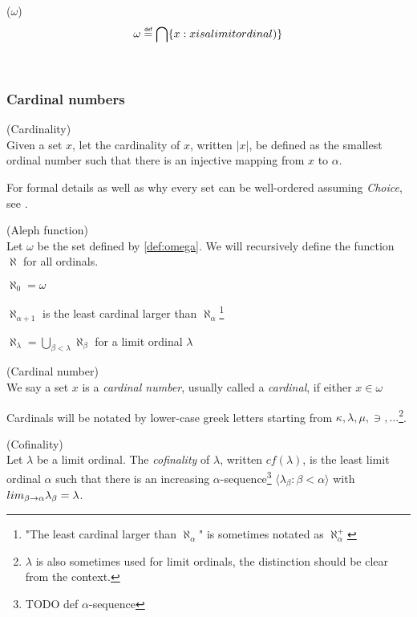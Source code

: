 \begin{definition}{($\omega$)}\\
\begin{equation}
\omega \defeq \bigcap\{x : x is a limit ordinal)\}
\end{equation}
\end{definition}

\

\subsubsection{Cardinal numbers}

\begin{definition}{(Cardinality)}\\
Given a set $x$, let the cardinality of $x$, written $|x|$, be defined as the smallest ordinal number such that there is an injective mapping from $x$ to $\alpha$.
\end{definition}
For formal details as well as why every set can be well-ordered assuming \emph{Choice}, see \cite{JechBook}.

\begin{definition}{(Aleph function)}\label{def:aleph}\\
Let $\omega$ be the set defined by \ref{def:omega}.
We will recursively define the function $\aleph$ for all ordinals.
\bce[(i)]
\item $\aleph_0 = \omega$
\item $\aleph_{\alpha+1}$ is the least cardinal larger than $\aleph_\alpha$\footnote{"The least cardinal larger than $\aleph_\alpha$" is sometimes notated as $\aleph_\alpha^{+}$}
\item $\aleph_\lambda = \bigcup_{\beta < \lambda}\aleph_\beta$ for a limit ordinal $\lambda$
\ece
\end{definition}

\begin{definition}{(Cardinal number)}\label{def:cardinal}\\
We say a set $x$ is a \emph{cardinal number}, usually called a \emph{cardinal}, if either $x \in \omega$
\end{definition}
Cardinals will be notated by lower-case greek letters starting from $\kappa, \lambda, \mu, \ni, \ldots$\footnote{$\lambda$ is also sometimes used for limit ordinals, the distinction should be clear from the context.}.

\begin{definition}{(Cofinality)}\label{def:cofinality}\\
Let $\lambda$ be a limit ordinal. The \emph{cofinality} of $\lambda$, written $cf(\lambda)$, is the least limit ordinal $\alpha$ such that there is an increasing $\alpha$-sequence\footnote{TODO def $\alpha$-sequence} $\langle \lambda_\beta : \beta < \alpha \rangle$ with $lim_{\beta \rightarrow \alpha} \lambda_\beta = \lambda$.
\end{definition}

